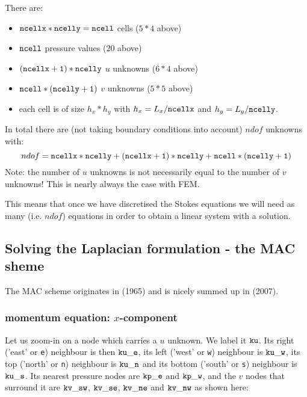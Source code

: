 There are:
\begin{itemize}
\item ${\tt ncellx}*{\tt ncelly}={\tt ncell}$ cells ($5*4$ above)
\item ${\tt ncell}$ pressure values ($20$ above)
\item ${\tt (ncellx+1)}*{\tt ncelly}$ $u$ unknowns ($6*4$ above) 
\item ${\tt ncell}*{\tt (ncelly+1)}$ $v$ unknowns ($5*5$ above) 
\item each cell is of size $h_x * h_y$ with $h_x=L_x/{\tt ncellx}$ 
and $h_y=L_y/{\tt ncelly}$.
\end{itemize}
In total there are (not taking boundary conditions into account)
$ndof$ unknowns with:
\[
ndof= {\tt ncellx}*{\tt ncelly} 
+ {\tt (ncellx+1)}*{\tt ncelly}
+ {\tt ncell}*{\tt (ncelly+1)}
\]
Note: the number of $u$ unknowns is not necessarily equal to the number of $v$
unknowns! This is nearly always the case with FEM. 

This means that once we have discretised the Stokes equations we will need
as many (i.e. $ndof$) equations in order to obtain a linear system with a solution.

\subsection{Solving the Laplacian formulation - the MAC sheme}

The MAC scheme originates in \textcite{hawe65} (1965) and is nicely
summed up in \textcite{kans07} (2007).

\subsubsection{momentum equation: $x$-component}

Let us zoom-in on a node which carries a $u$ unknown. 
We label it ${\tt ku}$. Its right ('east' or {\tt e})  neighbour is then ${\tt ku\_e}$,
its left ('west' or {\tt w}) neighbour is ${\tt ku\_w}$, 
its top ('north' or {\tt n}) neighbour is ${\tt ku\_n}$ and 
its bottom ('south' or {\tt s}) neighbour is ${\tt ku\_s}$.
Its nearest pressure nodes are ${\tt kp\_e}$ and ${\tt kp\_w}$, and the $v$ nodes
that surround it are ${\tt kv\_sw}$, ${\tt kv\_se}$, ${\tt kv\_ne}$ and ${\tt kv\_nw}$
as shown here:



